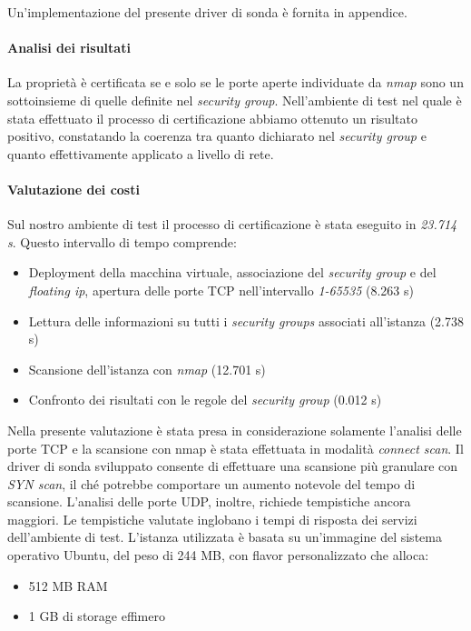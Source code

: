 \documentclass[../main.tex]{subfiles}
\begin{document}
Un'implementazione del presente driver di sonda è fornita in appendice.

\paragraph{Analisi dei risultati}
La proprietà è certificata se e solo se le porte aperte individuate da \textit{nmap} sono un sottoinsieme di quelle definite nel \textit{security group}.
Nell'ambiente di test nel quale è stata effettuato il processo di certificazione abbiamo ottenuto un risultato positivo, constatando la coerenza tra quanto dichiarato nel \textit{security group} e quanto effettivamente applicato a livello di rete.

\paragraph{Valutazione dei costi}

Sul nostro ambiente di test il processo di certificazione è stata eseguito in \textit{23.714 s}.
Questo intervallo di tempo comprende:
\begin{itemize}
\item Deployment della macchina virtuale, associazione del \textit{security group} e del \textit{floating ip}, apertura delle porte TCP nell'intervallo \textit{1-65535} (8.263 s)
\item Lettura delle informazioni su tutti i \textit{security groups} associati all'istanza (2.738 s)
\item Scansione dell'istanza con \textit{nmap} (12.701 s)
\item Confronto dei risultati con le regole del \textit{security group} (0.012 s)
\end{itemize}
Nella presente valutazione è stata presa in considerazione solamente l'analisi delle porte TCP e la scansione con nmap è stata effettuata in modalità \textit{connect scan}.
Il driver di sonda sviluppato consente di effettuare una scansione più granulare con \textit{SYN scan}, il ché potrebbe comportare un aumento notevole del tempo di scansione.
L'analisi delle porte UDP, inoltre, richiede tempistiche ancora maggiori.
Le tempistiche valutate inglobano i tempi di risposta dei servizi dell'ambiente di test.
L'istanza utilizzata è basata su un'immagine del sistema operativo Ubuntu, del peso di 244 MB, con flavor personalizzato che alloca:
\begin{itemize}
\item 512 MB RAM
\item 1 GB di storage effimero
\end{itemize}
\end{document}
